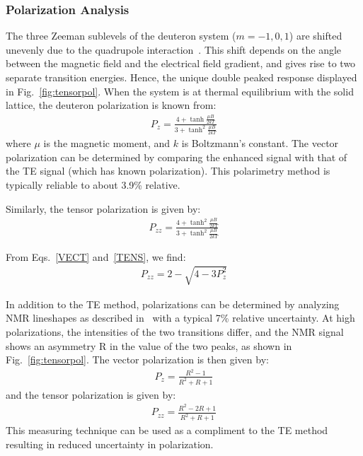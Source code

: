 \subsubsection{Polarization Analysis} 
The three Zeeman sublevels of the deuteron system ($m=-1,0,1$) are
shifted unevenly due to the quadrupole interaction~\cite{Meyer:1985dta}. This shift
depends on the angle between the magnetic field and the electrical field gradient, and gives rise to two separate transition
energies. Hence, the unique double peaked response displayed in Fig.~\ref{fig:tensorpol}.
When the system is at thermal equilibrium with the solid lattice, the deuteron polarization is known from:
\begin{eqnarray}
\label{VECT}
P_z = \frac{4+\tanh\frac{\mu B}{2 k T}} {3+\tanh^2\frac{\mu B}{2 k T}    }
\end{eqnarray}
where $\mu$ is the magnetic moment, and $k$ is Boltzmann's constant.  The vector polarization can be determined by comparing
the enhanced signal with that of the TE signal (which has known polarization).  This polarimetry method is typically reliable to about 3.9\% relative.

Similarly, the tensor polarization is given by: 
\begin{eqnarray}
\label{TENS}
P_{zz} = \frac{4+\tanh^2\frac{\mu B}{2 k T}} {3+\tanh^2\frac{\mu B}{2 k T}    }
\end{eqnarray}

From Eqs.~\ref{VECT} and~\ref{TENS}, we find:
\begin{eqnarray*}
\label{PZZEQN}
P_{zz}= 2 - \sqrt{4-3 P_z^2}
\end{eqnarray*}


In addition to the TE method, polarizations can be determined by analyzing NMR lineshapes as described in~\cite{Dulya:1997qc} with a typical  7\% relative uncertainty.  At high polarizations, the
intensities of the two transitions differ, and the NMR signal shows an asymmetry R in the
value of the two peaks, as shown in Fig.~\ref{fig:tensorpol}.  The vector polarization is then given by:
\begin{eqnarray}
\label{RVECT}
P_{z} = \frac{R^2-1}{R^2+R+1}
\end{eqnarray}
and the tensor polarization is given by:
\begin{eqnarray}
\label{TVECT}P_{zz} = \frac{R^2-2 R +1}{R^2+R+1}
\end{eqnarray}
This measuring technique can be used as a compliment to the TE method resulting in reduced uncertainty in polarization.

